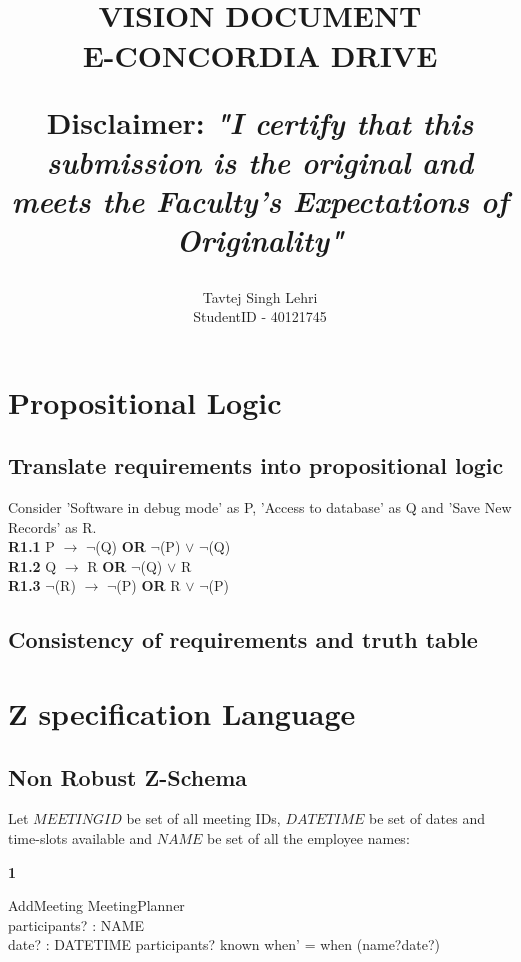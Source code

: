 \documentclass[fuzz]{article}
\title{\normalsize \texts{SOEN 6481 Summer 2021}\\ [1.0cm]
\large \textbf{\uppercase{Vision Document}}\\
\large \textbf{\uppercase{E-Concordia Drive}}
\normalsize \vspace*{2\baselineskip}\\
\author{{Tavtej Singh Lehri\\
StudentID - 40121745}}

\textbf{Disclaimer:}
\textit{"I certify that this submission is the original and meets the Faculty's Expectations of Originality"}
}
\begin{document}
\maketitle

\tableofcontents
\clearpage

\section{Propositional Logic}
\subsection{Translate requirements into propositional logic}
Consider 'Software in debug mode' as P, 'Access to database' as Q and 'Save New Records' as R.\\[0.3cm]
\textbf{R1.1} P $\rightarrow$ $\neg$(Q) \textbf{OR} $\neg$(P) $\lor$ $\neg$(Q)\\[0.3cm]
\textbf{R1.2} Q $\rightarrow$ R \textbf{OR} $\neg$(Q) $\lor$ R\\[0.3cm]
\textbf{R1.3} $\neg$(R) $\rightarrow$ $\neg$(P) \textbf{OR} R $\lor$ $\neg$(P)

\subsection{Consistency of requirements and truth table}

\section{Z specification Language}
\subsection{Non Robust Z-Schema}

\noindent Let $MEETINGID$ be set of all meeting IDs, $DATETIME$ be set of dates and time-slots available and $NAME$ be set of all the employee names:

\begin{zed}
\end{zed}

\textbf{1}
\begin{schema}{AddMeeting}
\Delta MeetingPlanner \\
participants? : NAME \\
date? : DATETIME
\where
participants? \notin known
\also
when' = when \bigcup (name?\pfun date?)
\end{schema}
\end{document}
